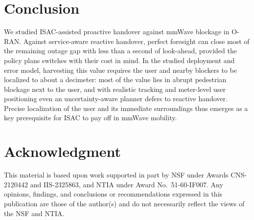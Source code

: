 \documentclass[conference]{IEEEtran}
\begin{document}
\section{Conclusion}
We studied ISAC-assisted proactive handover against mmWave blockage in
O-RAN. Against service-aware reactive handover, perfect foresight can
close most of the remaining outage gap with less than a second of
look-ahead, provided the policy plans switches with their cost in mind.
In the studied deployment and error model, harvesting this value
requires the user and nearby blockers to be localized to about a
decimeter: most of the value lies in abrupt pedestrian blockage next to
the user, and with realistic tracking and meter-level user positioning
even an uncertainty-aware planner defers to reactive handover. Precise
localization of the user and its immediate surroundings thus emerges as
a key prerequisite for ISAC to pay off in mmWave mobility.

\section*{Acknowledgment}
This material is based upon work supported in part by NSF under Awards
CNS-2120442 and IIS-2325863, and NTIA under Award No.\ 51-60-IF007. Any
opinions, findings, and conclusions or recommendations expressed in this
publication are those of the author(s) and do not necessarily reflect
the views of the NSF and NTIA.



\end{document}
